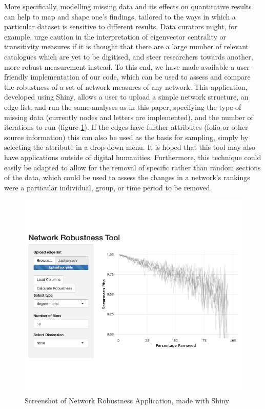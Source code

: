 \documentclass[]{article}
\begin{document}
More specifically, modelling missing data and its effects on quantitative results can help to map and shape one's findings, tailored to the ways in which a particular dataset is sensitive to different results. Data curators might, for example, urge caution in the interpretation of eigenvector centrality or transitivity measures if it is thought that there are a large number of relevant catalogues which are yet to be digitised, and steer researchers towards another, more robust measurement instead. To this end, we have made available a user-friendly implementation of our code, which can be used to assess and compare the robustness of a set of network measures of any network. This application, developed using Shiny, allows a user to upload a simple network structure, an edge list, and run the same analyses as in this paper, specifying the type of missing data (currently nodes and letters are implemented), and the number of iterations to run (figure \ref{fig:screenshot}). If the edges have further attributes (folio or other source information) this can also be used as the basis for sampling, simply by selecting the attribute in a drop-down menu. It is hoped that this tool may also have applications outside of digital humanities. Furthermore, this technique could easily be adapted to allow for the removal of specific rather than random sections of the data, which could be used to assess the changes in a network's rankings were a particular individual, group, or time period to be removed.

\begin{figure}
\centering
\includegraphics{network_robustness_article_anon_files/figure-latex/screenshot-1.pdf}
\caption{\label{fig:screenshot}Screenshot of Network Robustness Application, made with Shiny}
\end{figure}
\end{document}
